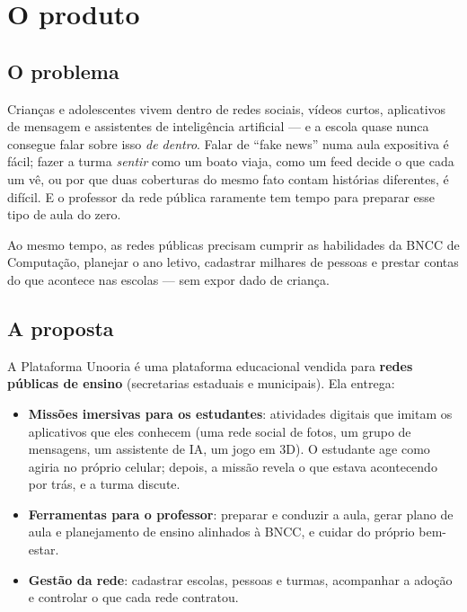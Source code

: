 \chapter{O produto}
\label{cap:produto}

\section{O problema}

Crianças e adolescentes vivem dentro de redes sociais, vídeos curtos,
aplicativos de mensagem e assistentes de inteligência artificial --- e a
escola quase nunca consegue falar sobre isso \emph{de dentro}. Falar de
\enquote{fake news} numa aula expositiva é fácil; fazer a turma
\emph{sentir} como um boato viaja, como um feed decide o que cada um vê, ou
por que duas coberturas do mesmo fato contam histórias diferentes, é
difícil. E o professor da rede pública raramente tem tempo para preparar
esse tipo de aula do zero.

Ao mesmo tempo, as redes públicas precisam cumprir as habilidades da BNCC de
Computação, planejar o ano letivo, cadastrar milhares de pessoas e prestar
contas do que acontece nas escolas --- sem expor dado de criança.

\section{A proposta}

A Plataforma Unooria é uma plataforma educacional vendida para \textbf{redes
públicas de ensino} (secretarias estaduais e municipais). Ela entrega:

\begin{itemize}
  \item \textbf{Missões imersivas para os estudantes}: atividades digitais que
    imitam os aplicativos que eles conhecem (uma rede social de fotos, um
    grupo de mensagens, um assistente de IA, um jogo em 3D). O estudante age como agiria no próprio celular; depois, a missão
    revela o que estava acontecendo por trás, e a turma discute.
  \item \textbf{Ferramentas para o professor}: preparar e conduzir a aula,
    gerar plano de aula e planejamento de ensino alinhados à BNCC, e cuidar do
    próprio bem-estar.
  \item \textbf{Gestão da rede}: cadastrar escolas, pessoas e turmas,
    acompanhar a adoção e controlar o que cada rede contratou.
\end{itemize}

